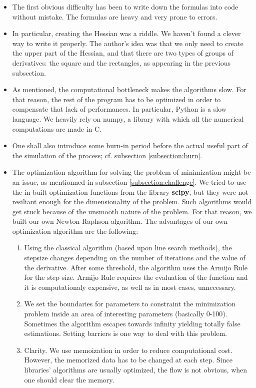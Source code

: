 \documentclass[11pt]{book}
\begin{document}
\begin{itemize}
\item The first obvious difficulty has been to write down the formulas into code without mistake. The formulas are heavy and very prone to errors.
\item In particular, creating the Hessian was a riddle. We haven't found a clever way to write it properly. The author's idea was that we only need to create the upper part of the Hessian, and that there are two types of groups of derivatives: the square and the rectangles, as appearing in the previous subsection.
\item As mentioned, the computational bottleneck makes the algorithms slow. For that reason, the rest of the program has to be optimized in order to compensate that lack of performances. In particular, Python is a slow language. We heavily rely on numpy, a library with which all the numerical computations are made in C.
\item One shall also introduce some burn-in period before the actual useful part of the simulation of the process; cf. subsection \ref{subsection:burn}.
\item The optimization algorithm for solving the problem of minimization might be an issue, as mentionned in subsection \ref{subsection:challenge}. We tried to use the in-built optimization functions from the library \textbf{scipy}, but they were not resiliant enough for the dimensionality of the problem. Such algorithms would get stuck because of the unsmooth nature of the problem. For that reason, we built our own Newton-Raphson algorithm. The advantages of our own optimization algorithm are the following:
\begin{enumerate}
\item Using the classical algorithm (based upon line search methods), the stepsize changes depending on the number of iterations and the value of the derivative. After some threshold, the algorithm uses the Armijo Rule for the step size. Armijo Rule requires the evaluation of the function and it is computationaly expensive, as well as in most cases, unnecessary.
\item We set the boundaries for parameters to constraint the minimization problem inside an area of interesting parameters (basically 0-100). Sometimes the algorithm escapes towards infinity yielding totally false estimations. Setting barriers is one way to deal with this problem. 
\item Clarity. We use memoization in order to reduce computational cost. However, the memorized data has to be changed at each step. Since libraries' algorithms are usually optimized, the flow is not obvious,  when one should clear the memory.

\end{enumerate}
\end{itemize}
\end{document}
